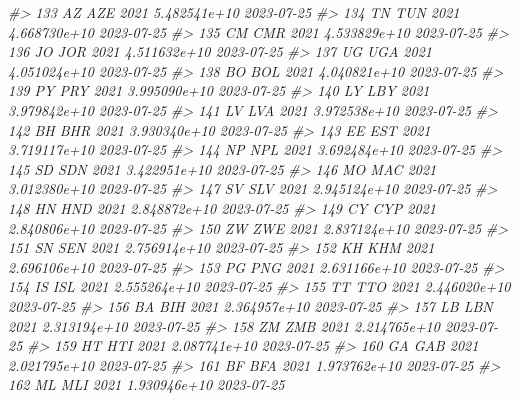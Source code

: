 \documentclass[
  xelatex, ja=standard]{bxjsbook}
\newenvironment{Shaded}{\begin{snugshade}}{\end{snugshade}}
\newcommand{\CommentTok}[1]{\textcolor[rgb]{0.56,0.35,0.01}{\textit{#1}}}
\theoremstyle{definition}
\theoremstyle{definition}
\theoremstyle{definition}
\theoremstyle{definition}
\theoremstyle{remark}
\begin{document}
\begin{Shaded}
\begin{Highlighting}[]
\CommentTok{\#\textgreater{} 133    AZ   AZE 2021 5.482541e+10         2023{-}07{-}25}
\CommentTok{\#\textgreater{} 134    TN   TUN 2021 4.668730e+10         2023{-}07{-}25}
\CommentTok{\#\textgreater{} 135    CM   CMR 2021 4.533829e+10         2023{-}07{-}25}
\CommentTok{\#\textgreater{} 136    JO   JOR 2021 4.511632e+10         2023{-}07{-}25}
\CommentTok{\#\textgreater{} 137    UG   UGA 2021 4.051024e+10         2023{-}07{-}25}
\CommentTok{\#\textgreater{} 138    BO   BOL 2021 4.040821e+10         2023{-}07{-}25}
\CommentTok{\#\textgreater{} 139    PY   PRY 2021 3.995090e+10         2023{-}07{-}25}
\CommentTok{\#\textgreater{} 140    LY   LBY 2021 3.979842e+10         2023{-}07{-}25}
\CommentTok{\#\textgreater{} 141    LV   LVA 2021 3.972538e+10         2023{-}07{-}25}
\CommentTok{\#\textgreater{} 142    BH   BHR 2021 3.930340e+10         2023{-}07{-}25}
\CommentTok{\#\textgreater{} 143    EE   EST 2021 3.719117e+10         2023{-}07{-}25}
\CommentTok{\#\textgreater{} 144    NP   NPL 2021 3.692484e+10         2023{-}07{-}25}
\CommentTok{\#\textgreater{} 145    SD   SDN 2021 3.422951e+10         2023{-}07{-}25}
\CommentTok{\#\textgreater{} 146    MO   MAC 2021 3.012380e+10         2023{-}07{-}25}
\CommentTok{\#\textgreater{} 147    SV   SLV 2021 2.945124e+10         2023{-}07{-}25}
\CommentTok{\#\textgreater{} 148    HN   HND 2021 2.848872e+10         2023{-}07{-}25}
\CommentTok{\#\textgreater{} 149    CY   CYP 2021 2.840806e+10         2023{-}07{-}25}
\CommentTok{\#\textgreater{} 150    ZW   ZWE 2021 2.837124e+10         2023{-}07{-}25}
\CommentTok{\#\textgreater{} 151    SN   SEN 2021 2.756914e+10         2023{-}07{-}25}
\CommentTok{\#\textgreater{} 152    KH   KHM 2021 2.696106e+10         2023{-}07{-}25}
\CommentTok{\#\textgreater{} 153    PG   PNG 2021 2.631166e+10         2023{-}07{-}25}
\CommentTok{\#\textgreater{} 154    IS   ISL 2021 2.555264e+10         2023{-}07{-}25}
\CommentTok{\#\textgreater{} 155    TT   TTO 2021 2.446020e+10         2023{-}07{-}25}
\CommentTok{\#\textgreater{} 156    BA   BIH 2021 2.364957e+10         2023{-}07{-}25}
\CommentTok{\#\textgreater{} 157    LB   LBN 2021 2.313194e+10         2023{-}07{-}25}
\CommentTok{\#\textgreater{} 158    ZM   ZMB 2021 2.214765e+10         2023{-}07{-}25}
\CommentTok{\#\textgreater{} 159    HT   HTI 2021 2.087741e+10         2023{-}07{-}25}
\CommentTok{\#\textgreater{} 160    GA   GAB 2021 2.021795e+10         2023{-}07{-}25}
\CommentTok{\#\textgreater{} 161    BF   BFA 2021 1.973762e+10         2023{-}07{-}25}
\CommentTok{\#\textgreater{} 162    ML   MLI 2021 1.930946e+10         2023{-}07{-}25}

\end{Highlighting}
\end{Shaded}
\end{document}
